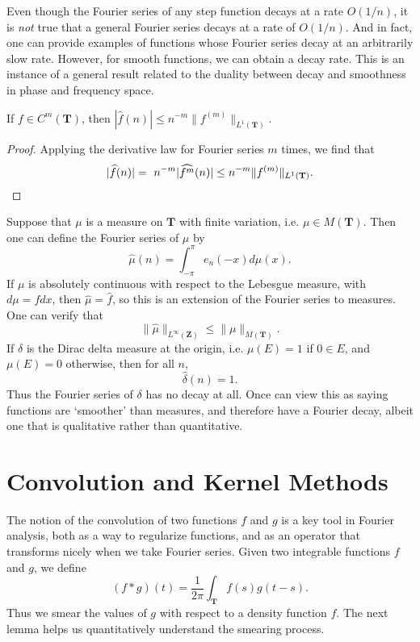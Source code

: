 Even though the Fourier series of any step function decays at a rate $O(1/n)$, it is {\it not} true that a general Fourier series decays at a rate of $O(1/n)$. And in fact, one can provide examples of functions whose Fourier series decay at an arbitrarily slow rate. However, for smooth functions, we can obtain a decay rate. This is an instance of a general result related to the duality between decay and smoothness in phase and frequency space.

\begin{theorem}
	If $f \in C^m(\mathbf{T})$, then $|\widehat{f}(n)| \leq n^{-m} \| f^{(m)} \|_{L^1(\mathbf{T})}$.
\end{theorem}
\begin{proof}
	Applying the derivative law for Fourier series $m$ times, we find that
	\[ |\widehat{f}(n)| = \ n^{-m} |\widehat{f^{m}}(n)| \leq n^{-m} \| f^{(m)} \|_{L^1(\mathbf{T})}. \qedhere \]
\end{proof}

Suppose that $\mu$ is a measure on $\mathbf{T}$ with finite variation, i.e. $\mu \in M(\mathbf{T})$. Then one can define the Fourier series of $\mu$ by
%
\[ \widehat{\mu}(n) = \int_{-\pi}^\pi e_n(-x) d\mu(x). \]
%
If $\mu$ is absolutely continuous with respect to the Lebesgue measure, with $d\mu = f dx$, then $\widehat{\mu} = \widehat{f}$, so this is an extension of the Fourier series to measures. One can verify that
%
\[ \| \widehat{\mu} \|_{L^\infty(\mathbf{Z})} \leq \| \mu \|_{M(\mathbf{T})}. \]
%
If $\delta$ is the Dirac delta measure at the origin, i.e. $\mu(E) = 1$ if $0 \in E$, and $\mu(E) = 0$ otherwise, then for all $n$,
%
\[ \widehat{\delta}(n) = 1. \]
%
Thus the Fourier series of $\delta$ has no decay at all. Once can view this as saying functions are `smoother' than measures, and therefore have a Fourier decay, albeit one that is qualitative rather than quantitative.

\section{Convolution and Kernel Methods}

The notion of the convolution of two functions $f$ and $g$ is a key tool in Fourier analysis, both as a way to regularize functions, and as an operator that transforms nicely when we take Fourier series. Given two integrable functions $f$ and $g$, we define
%
\[ (f * g)(t) = \frac{1}{2\pi} \int_{\mathbf{T}} f(s) g(t-s). \]
%
Thus we smear the values of $g$ with respect to a density function $f$. The next lemma helps us quantitatively understand the smearing process.

